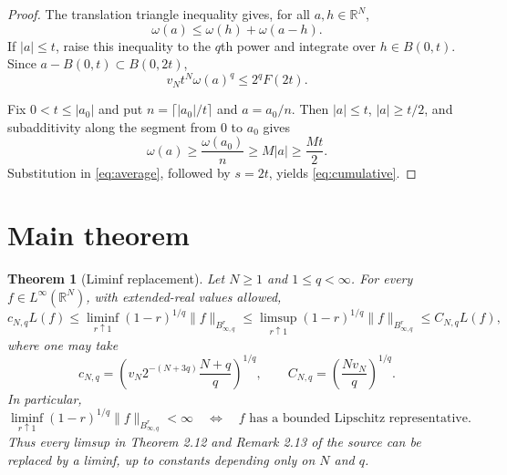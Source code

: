 \documentclass[11pt]{article}
\newtheorem{theorem}{Theorem}
\newcommand{\R}{\mathbb R}
\begin{document}
\begin{proof}
The translation triangle inequality gives, for all $a,h\in\R^N$,
\[
 \omega(a)\leq\omega(h)+\omega(a-h).
\]
If $|a|\leq t$, raise this inequality to the $q$th power and integrate over
$h\in B(0,t)$. Since $a-B(0,t)\subset B(0,2t)$,
\begin{equation}
 v_Nt^N\omega(a)^q\leq2^qF(2t).
 \label{eq:average}
\end{equation}

Fix $0<t\leq|a_0|$ and put $n=\lceil|a_0|/t\rceil$ and $a=a_0/n$.
Then $|a|\leq t$, $|a|\geq t/2$, and subadditivity along the segment from
$0$ to $a_0$ gives
\[
 \omega(a)\geq\frac{\omega(a_0)}n\geq M|a|\geq\frac{Mt}{2}.
\]
Substitution in \eqref{eq:average}, followed by $s=2t$, yields
\eqref{eq:cumulative}.
\end{proof}

\section{Main theorem}

\begin{theorem}[Liminf replacement]
Let $N\geq1$ and $1\leq q<\infty$. For every
$f\in L^\infty(\R^N)$, with extended-real values allowed,
\begin{equation}
 c_{N,q}L(f)
 \leq\liminf_{r\uparrow1}(1-r)^{1/q}\|f\|_{B^r_{\infty,q}}
 \leq\limsup_{r\uparrow1}(1-r)^{1/q}\|f\|_{B^r_{\infty,q}}
 \leq C_{N,q}L(f),
 \label{eq:main}
\end{equation}
where one may take
\[
 c_{N,q}=\left(v_N2^{-(N+3q)}\frac{N+q}{q}\right)^{1/q},
 \qquad
 C_{N,q}=\left(\frac{Nv_N}{q}\right)^{1/q}.
\]
In particular,
\[
 \liminf_{r\uparrow1}(1-r)^{1/q}\|f\|_{B^r_{\infty,q}}<\infty
 \quad\Longleftrightarrow\quad
 f\text{ has a bounded Lipschitz representative}.
\]
Thus every limsup in Theorem 2.12 and Remark 2.13 of the source can be
replaced by a liminf, up to constants depending only on $N$ and $q$.
\end{theorem}
\end{document}
